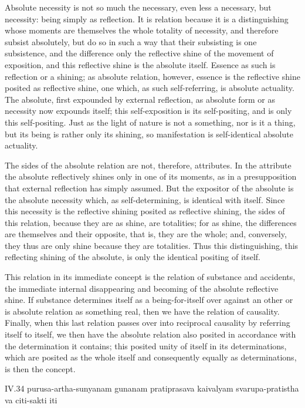 Absolute necessity is not so much the necessary,
even less a necessary, but necessity:
being simply as reflection.
It is relation because it is a distinguishing
whose moments are themselves
the whole totality of necessity,
and therefore subsist absolutely,
but do so in such a way that
their subsisting is one subsistence,
and the difference only the reflective shine of
the movement of exposition,
and this reflective shine is the absolute itself.
Essence as such is reflection or a shining;
as absolute relation, however, essence is the
reflective shine posited as reflective shine,
one which, as such self-referring, is absolute actuality.
The absolute, first expounded by external reflection,
as absolute form or as necessity now expounds itself;
this self-exposition is its self-positing,
and is only this self-positing.
Just as the light of nature is not a something,
nor is it a thing, but its being is rather only its shining,
so manifestation is self-identical absolute actuality.

The sides of the absolute relation
are not, therefore, attributes.
In the attribute the absolute reflectively shines
only in one of its moments,
as in a presupposition that
external reflection has simply assumed.
But the expositor of the absolute is the absolute necessity
which, as self-determining, is identical with itself.
Since this necessity is the reflective shining
posited as reflective shining, the sides of this relation,
because they are as shine, are totalities;
for as shine, the differences are
themselves and their opposite,
that is, they are the whole;
and, conversely, they thus are only shine
because they are totalities.
Thus this distinguishing,
this reflecting shining of the absolute,
is only the identical positing of itself.

This relation in its immediate concept is
the relation of substance and accidents,
the immediate internal disappearing and becoming
of the absolute reflective shine.
If substance determines itself as a being-for-itself over
against an other or is absolute relation as something real,
then we have the relation of causality.
Finally, when this last relation passes over into
reciprocal causality by referring itself to itself,
we then have the absolute relation also posited
in accordance with the determination it contains;
this posited unity of itself in its determinations,
which are posited as the whole itself
and consequently equally as determinations,
is then the concept.

IV.34
purusa-artha-sunyanam gunanam pratiprasava kaivalyam
svarupa-pratistha va citi-sakti iti

